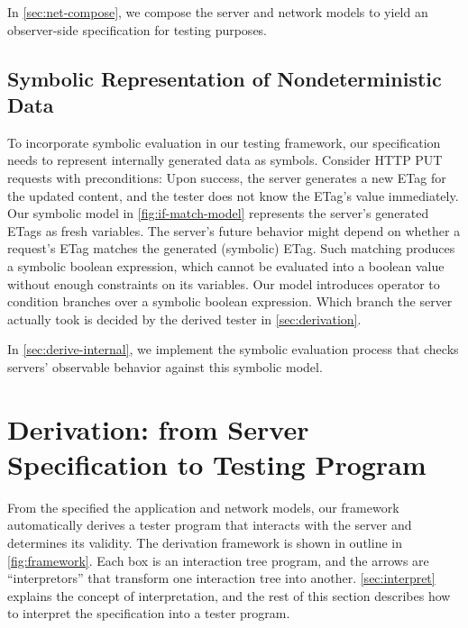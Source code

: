 In \autoref{sec:net-compose}, we compose the server and network models to yield an
observer-side specification for testing purposes.

\subsection{Symbolic Representation of Nondeterministic Data}

To incorporate symbolic evaluation in our testing framework, our specification
needs to represent internally generated data as symbols.  Consider HTTP
PUT requests with  preconditions: Upon success, the server
generates a new ETag for the updated content, and the tester does not know the
ETag's value immediately.  Our symbolic model in \autoref{fig:if-match-model}
represents the server's generated ETags as fresh variables.  The server's future
behavior might depend on whether a request's ETag matches the generated
(symbolic) ETag.  Such matching produces a symbolic boolean expression, which
cannot be evaluated into a boolean value without enough constraints on its
variables.  Our model introduces  operator to condition branches over
a symbolic boolean expression.  Which branch the server actually took is decided
by the derived tester in \autoref{sec:derivation}.

In \autoref{sec:derive-internal}, we implement the symbolic evaluation process
that checks servers' observable behavior against this symbolic model.

\section{Derivation: from Server Specification to Testing Program}
From the specified the application and network models,
our framework automatically derives a tester program that
interacts with the server and determines its validity.  The derivation framework
is shown in outline in \autoref{fig:framework}.  Each box is an interaction tree
program, and the arrows are
``interpretors'' that transform one interaction tree into another.
\autoref{sec:interpret} explains the concept of interpretation, and the rest of
this section describes how to interpret the specification into a tester program.

